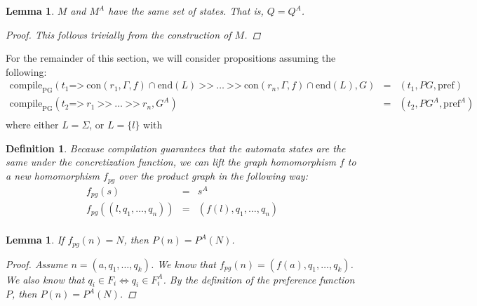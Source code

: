 \documentclass[twocolumn, openany]{sig-alternate-10pt}
\newcommand{\Prefer}{\texttt{>>}}
\newcommand{\Path}{\texttt{=>}}
\newcommand{\Con}{\mathrm{con}}
\newcommand{\CompilePg}{\ensuremath{\mathrm{compile}_\mathrm{PG}}}
\newcommand{\Pref}{\ensuremath{\mathrm{pref}}}
\newcommand{\EndR}{\ensuremath{\mathrm{end}}}
\newtheorem{defn}{Definition}
\newtheorem{lem}[thm]{Lemma}
\begin{document}
\begin{lem} $M$ and $M^A$ have the same set of states. That is, $Q = Q^A$.
    $ $
    \vspace{1em}
    \begin{proof}
      This follows trivially from the construction of $M$.
    \end{proof}
\end{lem}

\vspace{3em}
For the remainder of this section, we will consider propositions assuming the following: 
%
\[
\begin{array}{lll}
  \CompilePg(t_1 \Path~ \Con(r_1,\Gamma,f) \cap \EndR(L) ~\Prefer~ \ldots ~\Prefer~ \Con(r_n,\Gamma,f) \cap \EndR(L), G) &=& (t_1, PG, \Pref) \\
  \CompilePg(t_2 \Path~ r_1 ~\Prefer~ \ldots ~\Prefer~ r_n, G^A) &=& (t_2, PG^A, \Pref^A) \\
\end{array}
\]
%
where either $L = \Sigma$, or $L = \{ l \}$ with


\vspace{1em}



\begin{defn}
  Because compilation guarantees that the automata states are the same under the concretization function, we can lift the graph homomorphism $f$ to a new homomorphism $f_{pg}$ over the product graph in the following way:
  \[ \begin{array}{rcl}
    f_{pg}( s ) & = & s^A  \\
    f_{pg}( (l,q_1,\ldots,q_n) ) & = & (f(l),q_1,\ldots,q_n) \\
  \end{array} \]
\end{defn}

\vspace{1em}
\begin{lem}
  If $f_{pg}(n) = N$, then $P(n) = P^A(N)$.

  \begin{proof}
    Assume $n = (a,q_1,\dots,q_k)$. We know that $f_{pg}(n) = (f(a),q_1,\dots,q_k)$. 
    We also know that $q_i \in F_i \iff q_i \in F^A_i$. 
    By the definition of the preference function $P$, then $P(n) = P^A(N)$.
  \end{proof}

\end{lem}
\end{document}

